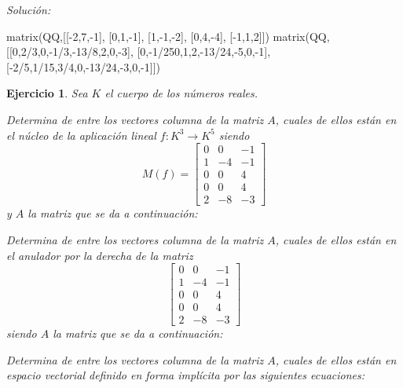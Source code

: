 \documentclass[12pt]{amsart}
\newtheorem{ejer}{Ejercicio}
\begin{document}
{\it Soluci\'on:}

\begin{sageblock}
matrix(QQ,[[-2,7,-1],
[0,1,-1],
[1,-1,-2],
[0,4,-4],
[-1,1,2]])
matrix(QQ,[[0,2/3,0,-1/3,-13/8,2,0,-3],
[0,-1/250,1,2,-13/24,-5,0,-1],
[-2/5,1/15,3/4,0,-13/24,-3,0,-1]])
\end{sageblock}



\begin{ejer} Sea $K$ el cuerpo de los n\'umeros reales.
\newline
\noindent\begin{minipage}{\textwidth}
\begin{tcolorbox}[colback = green!20!white,title=Versión Núcleo]
Determina de entre los vectores columna de la matriz $A$, cuales de ellos están en el núcleo de la aplicación lineal $f:K^{3} \to K^{5}$ siendo  $$ M(f) = \left[\begin{array}{rrr}
0 & 0 & -1 \\
1 & -4 & -1 \\
0 & 0 & 4 \\
0 & 0 & 4 \\
2 & -8 & -3
\end{array}\right] $$ y $A$ la matriz que se da a continuación:\end{tcolorbox}
\end{minipage} \newline
\noindent\begin{minipage}{\textwidth}
\begin{tcolorbox}[colback = blue!20!white,title=Versión Anulador]
Determina de entre los vectores columna de la matriz $A$, cuales de ellos están en el anulador por la derecha de la matriz $$ \left[\begin{array}{rrr}
0 & 0 & -1 \\
1 & -4 & -1 \\
0 & 0 & 4 \\
0 & 0 & 4 \\
2 & -8 & -3
\end{array}\right] $$ siendo $A$ la matriz que se da a continuación:\end{tcolorbox}
\end{minipage} \newline
\noindent\begin{minipage}{\textwidth} 
\begin{tcolorbox}[colback = red!20!white,title=Versión Ecuaciones Implícitas]
Determina de entre los vectores columna de la matriz $A$, cuales de ellos están en espacio vectorial definido en forma implícita por las siguientes ecuaciones:

\end{tcolorbox}
\end{minipage}
\end{ejer}
\end{document}
